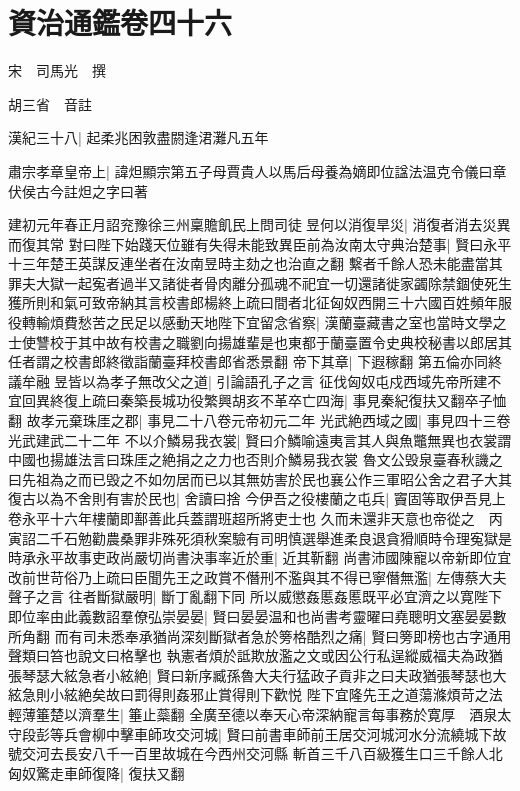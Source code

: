 \section{資治通鑑卷四十六}
宋　司馬光　撰

胡三省　音註

漢紀三十八|{
	起柔兆困敦盡閼逢涒灘凡五年}


肅宗孝章皇帝上|{
	諱炟顯宗第五子母賈貴人以馬后母養為嫡即位諡法温克令儀曰章伏侯古今註炟之字曰著}


建初元年春正月詔兖豫徐三州稟贍飢民上問司徒昱何以消復旱災|{
	消復者消去災異而復其常}
對曰陛下始踐天位雖有失得未能致異臣前為汝南太守典治楚事|{
	賢曰永平十三年楚王英謀反連坐者在汝南昱時主劾之也治直之翻}
繫者千餘人恐未能盡當其罪夫大獄一起寃者過半又諸徙者骨肉離分孤魂不祀宜一切還諸徙家蠲除禁錮使死生獲所則和氣可致帝納其言校書郎楊終上疏曰間者北征匈奴西開三十六國百姓頻年服役轉輸煩費愁苦之民足以感動天地陛下宜留念省察|{
	漢蘭臺藏書之室也當時文學之士使讐校于其中故有校書之職劉向揚雄輩是也東都于蘭臺置令史典校秘書以郎居其任者謂之校書郎終徵詣蘭臺拜校書郎省悉景翻}
帝下其章|{
	下遐稼翻}
第五倫亦同終議牟融昱皆以為孝子無改父之道|{
	引論語孔子之言}
征伐匈奴屯戍西域先帝所建不宜回異終復上疏曰秦築長城功役繁興胡亥不革卒亡四海|{
	事見秦紀復扶又翻卒子恤翻}
故孝元棄珠厓之郡|{
	事見二十八卷元帝初元二年}
光武絶西域之國|{
	事見四十三卷光武建武二十二年}
不以介鱗易我衣裳|{
	賢曰介鱗喻遠夷言其人與魚鼈無異也衣裳謂中國也揚雄法言曰珠厓之絶捐之之力也否則介鱗易我衣裳}
魯文公毁泉臺春秋譏之曰先祖為之而已毁之不如勿居而已以其無妨害於民也襄公作三軍昭公舍之君子大其復古以為不舍則有害於民也|{
	舍讀曰捨}
今伊吾之役樓蘭之屯兵|{
	竇固等取伊吾見上卷永平十六年樓蘭即鄯善此兵蓋謂班超所將吏士也}
久而未還非天意也帝從之　丙寅詔二千石勉勸農桑罪非殊死須秋案驗有司明慎選舉進柔良退貪猾順時令理寃獄是時承永平故事吏政尚嚴切尚書決事率近於重|{
	近其靳翻}
尚書沛國陳寵以帝新即位宜改前世苛俗乃上疏曰臣聞先王之政賞不僭刑不濫與其不得已寧僭無濫|{
	左傳蔡大夫聲子之言}
往者斷獄嚴明|{
	斷丁亂翻下同}
所以威懲姦慝姦慝既平必宜濟之以寛陛下即位率由此義數詔羣僚弘崇晏晏|{
	賢曰晏晏温和也尚書考靈曜曰堯聰明文塞晏晏數所角翻}
而有司未悉奉承猶尚深刻斷獄者急於篣格酷烈之痛|{
	賢曰篣即榜也古字通用聲類曰笞也說文曰格擊也}
執憲者煩於詆欺放濫之文或因公行私逞縱威福夫為政猶張琴瑟大絃急者小絃絶|{
	賢曰新序臧孫魯大夫行猛政子貢非之曰夫政猶張琴瑟也大絃急則小絃絶矣故曰罰得則姦邪止賞得則下歡悦}
陛下宜隆先王之道蕩滌煩苛之法輕薄箠楚以濟羣生|{
	箠止蘂翻}
全廣至德以奉天心帝深納寵言每事務於寛厚　酒泉太守段彭等兵會柳中擊車師攻交河城|{
	賢曰前書車師前王居交河城河水分流繞城下故號交河去長安八千一百里故城在今西州交河縣}
斬首三千八百級獲生口三千餘人北匈奴驚走車師復降|{
	復扶又翻}
